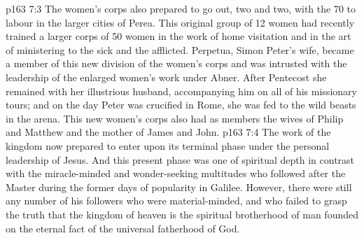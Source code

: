 \vs p163 7:3 The women’s corps also prepared to go out, two and two, with the 70 to labour in the larger cities of Perea. This original group of 12 women had recently trained a larger corps of 50 women in the work of home visitation and in the art of ministering to the sick and the afflicted. Perpetua, Simon Peter’s wife, became a member of this new division of the women’s corps and was intrusted with the leadership of the enlarged women’s work under Abner. After Pentecost she remained with her illustrious husband, accompanying him on all of his missionary tours; and on the day Peter was crucified in Rome, she was fed to the wild beasts in the arena. This new women’s corps also had as members the wives of Philip and Matthew and the mother of James and John.
\vs p163 7:4 The work of the kingdom now prepared to enter upon its terminal phase under the personal leadership of Jesus. And this present phase was one of spiritual depth in contrast with the miracle\hyp{}minded and wonder\hyp{}seeking multitudes who followed after the Master during the former days of popularity in Galilee. However, there were still any number of his followers who were material\hyp{}minded, and who failed to grasp the truth that the kingdom of heaven is the spiritual brotherhood of man founded on the eternal fact of the universal fatherhood of God.
